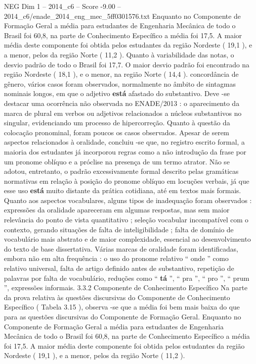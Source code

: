 \begin{textsample}{NEG Dim 1 – 2014\_c6 – Score -9.00 – 2014\_c6/enade\_2014\_eng\_mec\_5ff0301576.txt}
Enquanto no Componente de Formação Geral a média para estudantes de Engenharia Mecânica de todo o Brasil foi 60,8, na parte de Conhecimento Específico a média foi 17,5.
A maior média deste componente foi obtida pelos estudantes da região Nordeste ( 19,1 ), e a menor, pelos da região Norte ( 11,2 ).
Quanto à variabilidade das notas, o desvio padrão de todo o Brasil foi 17,7.
O maior desvio padrão foi encontrado na região Nordeste ( 18,1 ), e o menor, na região Norte ( 14,4 ). concordância de gênero, vários casos foram observados, normalmente no âmbito de sintagmas nominais longos, em que o adjetivo \textbf{está} afastado do substantivo.
Deve -se destacar uma ocorrência não observada no ENADE/2013 : o aparecimento da marca de plural em verbos ou adjetivos relacionados a núcleos substantivos no singular, evidenciando um processo de hipercorreção.
Quanto à questão da colocação pronominal, foram poucos os casos observados.
Apesar de serem aspectos relacionados à oralidade, concluiu -se que, no registro escrito formal, a maioria dos estudantes já incorporou regras como a não introdução da frase por um pronome oblíquo e a próclise na presença de um termo atrator.
Não se adotou, entretanto, o padrão excessivamente formal descrito pelas gramáticas normativas em relação à posição do pronome oblíquo em locuções verbais, já que esse uso \textbf{está} muito distante da prática cotidiana, até em textos mais formais.
Quanto aos aspectos vocabulares, alguns tipos de inadequação foram observados : expressões da oralidade apareceram em algumas respostas, mas sem maior relevância do ponto de vista quantitativo ; seleção vocabular incompatível com o contexto, gerando situações de falta de inteligibilidade ; falta de domínio de vocabulário mais abstrato e de maior complexidade, essencial ao desenvolvimento do texto de base dissertativa.
Várias marcas de oralidade foram identificadas, embora não em alta frequência : o uso do pronome relativo “ onde ” como relativo universal, falta de artigo definido antes de substantivo, repetição de palavras por falta de vocabulário, reduções como “ \textbf{tá} ”, “ pra ”, “ pro ”, “ prum ”, expressões informais. 3.3.2 Componente de Conhecimento Específico Na parte da prova relativa às questões discursivas do Componente de Conhecimento Específico ( Tabela 3.15 ), observa -se que a média foi bem mais baixa do que para as questões discursivas do Componente de Formação Geral.
Enquanto no Componente de Formação Geral a média para estudantes de Engenharia Mecânica de todo o Brasil foi 60,8, na parte de Conhecimento Específico a média foi 17,5.
A maior média deste componente foi obtida pelos estudantes da região Nordeste ( 19,1 ), e a menor, pelos da região Norte ( 11,2 ).

\end{textsample}
